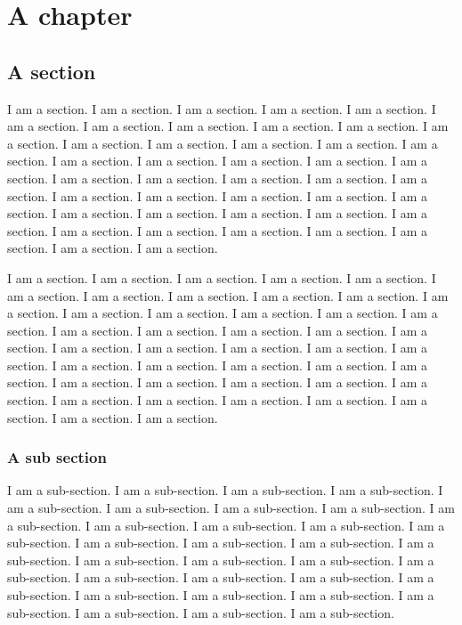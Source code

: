 \chapter{A chapter}

\section{A section}

I am a section. I am a section. I am a section. I am a section. I am a section. I am a section. I am a section. I am a section. I am a section. I am a section. I am a section. I am a section. I am a section. I am a section. I am a section. I am a section. I am a section. I am a section. I am a section. I am a section. I am a section. I am a section. I am a section. I am a section. I am a section. I am a section. I am a section. I am a section. I am a section. I am a section. I am a section. I am a section. I am a section. I am a section. I am a section. I am a section. I am a section. I am a section. I am a section. I am a section. I am a section. I am a section. I am a section. 

I am a section. I am a section. I am a section. I am a section. I am a section. I am a section. I am a section. I am a section. I am a section. I am a section. I am a section. I am a section. I am a section. I am a section. I am a section. I am a section. I am a section. I am a section. I am a section. I am a section. I am a section. I am a section. I am a section. I am a section. I am a section. I am a section. I am a section. I am a section. I am a section. I am a section. I am a section. I am a section. I am a section. I am a section. I am a section. I am a section. I am a section. I am a section. I am a section. I am a section. I am a section. I am a section. I am a section. 

\subsection{A sub section}

I am a sub-section. I am a sub-section. I am a sub-section. I am a sub-section. I am a sub-section. I am a sub-section. I am a sub-section. I am a sub-section. I am a sub-section. I am a sub-section. I am a sub-section. I am a sub-section. I am a sub-section. I am a sub-section. I am a sub-section. I am a sub-section. I am a sub-section. I am a sub-section. I am a sub-section. I am a sub-section. I am a sub-section. I am a sub-section. I am a sub-section. I am a sub-section. I am a sub-section. I am a sub-section. I am a sub-section. I am a sub-section. I am a sub-section. I am a sub-section. I am a sub-section. I am a sub-section. 


